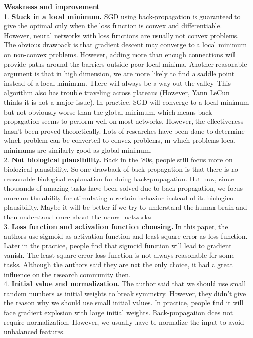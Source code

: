 \documentclass{article}
\begin{document}
\textbf{Weakness and improvement}\\
1. \textbf{Stuck in a local minimum.} SGD using back-propagation is guaranteed to give the optimal only when the loss function is convex and differentiable. However, neural networks with loss functions are usually not convex problems. The obvious drawback is that gradient descent may converge to a local minimum on non-convex problems. However, adding more than enough connections will provide paths around the barriers outside poor local minima. Another reasonable argument is that in high dimension, we are more likely to find a saddle point instead of a local minimum. There will always be a way out the valley. This algorithm also has trouble traveling across plateaus (However, Yann LeCun thinks it is not a major issue). In practice, SGD will converge to a local minimum but not obviously worse than the global minimum, which means back propagation seems to perform well on most networks. However, the effectiveness hasn't been proved theoretically. Lots of researches have been done to determine which problem can be converted to convex problems, in which problems local minimums are similarly good as global minimum.\\
2. \textbf{Not biological plausibility.} Back in the '80s, people still focus more on biological plausibility. So one drawback of back-propagation is that there is no reasonable biological explanation for doing back-propagation. But now, since thousands of amazing tasks have been solved due to back propagation, we focus more on the ability for stimulating a certain behavior instead of its biological plausibility. Maybe it will be better if we try to understand the human brain and then understand more about the neural networks.\\
3. \textbf{Loss function and activation function choosing.} In this paper, the authors use sigmoid as activation function and least square error as loss function. Later in the practice, people find that sigmoid function will lead to gradient vanish. The least square error loss function is not always reasonable for some tasks. Although the authors said they are not the only choice, it had a great influence on the research community then.\\
4. \textbf{Initial value and normalization.} The author said that we should use small random numbers as initial weights to break symmetry. However, they didn't give the reason why we should use small initial values. In practice, people find it will face gradient explosion with large initial weights. Back-propagation does not require normalization. However, we usually have to normalize the input to avoid unbalanced features.\\
\end{document}
